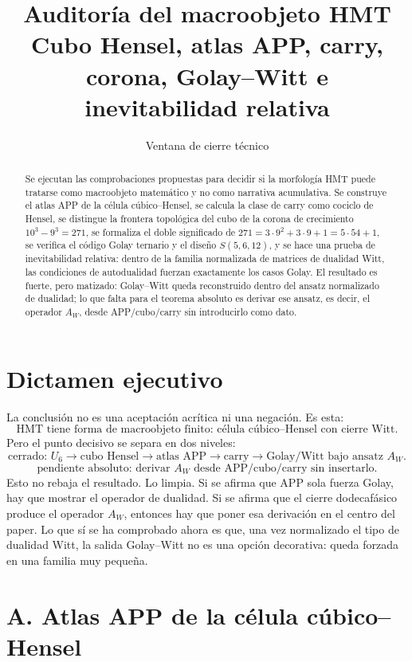 \documentclass[11pt,a4paper]{article}
\title{\bfseries Auditor\'ia del macroobjeto HMT\\\large Cubo Hensel, atlas APP, carry, corona, Golay--Witt e inevitabilidad relativa}
\author{Ventana de cierre t\'ecnico}
\date{}
\theoremstyle{definition}\newtheorem{definicion}[teorema]{Definici\'on}
\theoremstyle{remark}\newtheorem{observacion}[teorema]{Observaci\'on}
\begin{document}
\maketitle

\begin{abstract}
Se ejecutan las comprobaciones propuestas para decidir si la morfolog\'ia HMT puede tratarse como macroobjeto matem\'atico y no como narrativa acumulativa. Se construye el atlas APP de la c\'elula c\'ubico--Hensel, se calcula la clase de carry como cociclo de Hensel, se distingue la frontera topol\'ogica del cubo de la corona de crecimiento \(10^3-9^3=271\), se formaliza el doble significado de \(271=3\cdot9^2+3\cdot9+1=5\cdot54+1\), se verifica el c\'odigo Golay ternario y el dise\~no \(S(5,6,12)\), y se hace una prueba de inevitabilidad relativa: dentro de la familia normalizada de matrices de dualidad Witt, las condiciones de autodualidad fuerzan exactamente los casos Golay. El resultado es fuerte, pero matizado: Golay--Witt queda reconstruido dentro del ansatz normalizado de dualidad; lo que falta para el teorema absoluto es derivar ese ansatz, es decir, el operador \(A_W\), desde APP/cubo/carry sin introducirlo como dato.
\end{abstract}

\tableofcontents

\section{Dictamen ejecutivo}

La conclusi\'on no es una aceptaci\'on acr\'itica ni una negaci\'on. Es esta:
\[
\boxed{\text{HMT tiene forma de macroobjeto finito: c\'elula c\'ubico--Hensel con cierre Witt.}}
\]
Pero el punto decisivo se separa en dos niveles:
\[
\boxed{\text{cerrado: } U_6\to\text{cubo Hensel}\to\text{atlas APP}\to\text{carry}\to\text{Golay/Witt bajo ansatz }A_W.}
\]
\[
\boxed{\text{pendiente absoluto: derivar }A_W\text{ desde APP/cubo/carry sin insertarlo.}}
\]
Esto no rebaja el resultado. Lo limpia. Si se afirma que APP sola fuerza Golay, hay que mostrar el operador de dualidad. Si se afirma que el cierre dodecaf\'asico produce el operador \(A_W\), entonces hay que poner esa derivaci\'on en el centro del paper. Lo que s\'i se ha comprobado ahora es que, una vez normalizado el tipo de dualidad Witt, la salida Golay--Witt no es una opci\'on decorativa: queda forzada en una familia muy peque\~na.

\section{A. Atlas APP de la c\'elula c\'ubico--Hensel}
\end{document}
